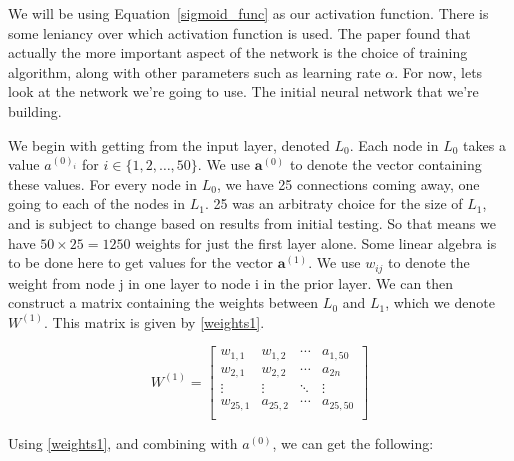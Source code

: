 We will be using Equation~\ref{sigmoid_func} as our activation function. There is some leniancy over which activation function is used. The paper \cite{sibi} found that actually the more important aspect of 
the network is the choice of training algorithm, along with other parameters such as learning rate $\alpha$. For now, lets look at the network we're going to use. The initial neural network that we're building. 

We begin with getting from the input layer, denoted $L_0$. Each node in $L_0$ takes a value $a^{(0)_i}$ for $i \in \{1,2,\ldots,50\}$. We use $\textbf{a}^{(0)}$ to denote the vector
containing these values. For every node in $L_0$, we have 25 connections coming away, one going to each of the nodes in $L_1$. 25 was an arbitraty choice for the size of $L_1$, and is
subject to change based on results from initial testing. So that means we have $50 \times 25 = 1250$ weights for just the first layer alone. Some linear algebra is to be done here to get 
values for the vector $\textbf{a}^{(1)}$. We use $w_{ij}$ to denote the weight from node j in one layer to node i in the prior layer. We can then construct a matrix containing the weights
between $L_0$ and $L_1$, which we denote $W^{(1)}$. This matrix is given by \ref{weights1}.

\begin{equation}
    W^{(1)} =
    \left[ {\begin{array}{cccc}
      w_{1,1} & w_{1,2} & \cdots & a_{1,50}\\
      w_{2,1} & w_{2,2} & \cdots & a_{2n}\\
      \vdots & \vdots & \ddots & \vdots\\
      w_{25,1} & a_{25,2} & \cdots & a_{25,50}\\
    \end{array} } \right]
    \label{weights1}
\end{equation}

Using \ref{weights1}, and combining with $a^{(0)}$, we can get the following:

